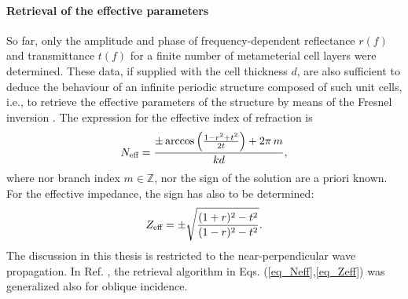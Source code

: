 \paragraph{Retrieval of the effective parameters} %
So far, only the amplitude and phase of frequency-dependent reflectance $r(f)$ and transmittance $t(f)$ for a finite number of metameterial cell layers were determined. 
These data, if supplied with the cell thickness $d$, are also sufficient to deduce the behaviour of an infinite periodic structure composed of such unit cells, i.e., to retrieve the effective parameters of the structure by means of the Fresnel inversion \cite{smith2002determination} \cite[pp. 51-55]{shalaev2010book}. 
The expression for the effective index of refraction is
\begin{equation} N_{\text{eff} } = \frac{\pm \arccos\left(\frac{1 - r^2+t^2}{2 t}\right) + 2\pi\,m}{k d}, \label{eq_Neff} \end{equation}
where nor branch index $m\in \mathbb{Z}$, nor the sign of the solution are a priori known. For the effective impedance, the sign has also to be determined: 
\begin{equation} Z_{\text{eff} } = \pm \sqrt{\frac{(1+r)^2 - t^2}{(1-r)^2 - t^2}}. \label{eq_Zeff} \end{equation}
The discussion in this thesis is restricted to the near-perpendicular wave propagation. In Ref. \cite{menzel2008retrieving}, the retrieval algorithm in Eqs. (\ref{eq_Neff},\ref{eq_Zeff}) was generalized also for oblique incidence.

